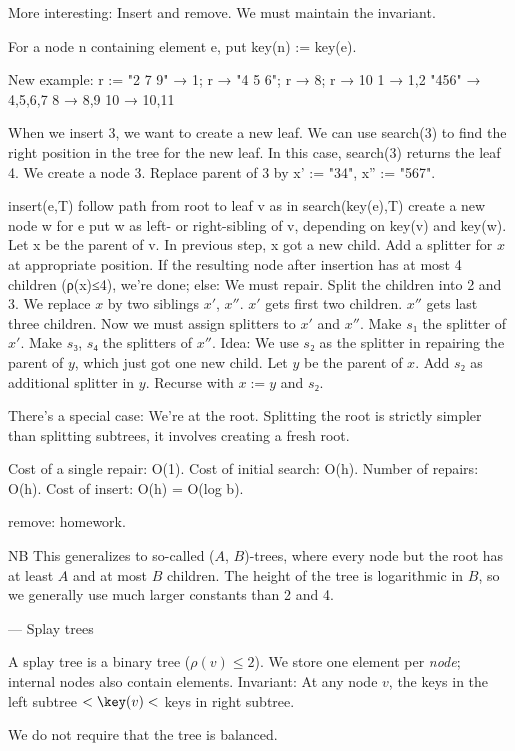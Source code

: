 More interesting: Insert and remove.
We must maintain the invariant.

For a node n containing element e, put key(n) := key(e).

New example:
	r := "2 7 9" → 1; r → "4 5 6"; r → 8; r → 10
	1 → 1,2
	"456" → 4,5,6,7
	8 → 8,9
	10 → 10,11

When we insert 3, we want to create a new leaf.
We can use search(3) to find the right position in the tree for the new leaf.
In this case, search(3) returns the leaf 4.
We create a node 3.
Replace parent of 3 by
	x' := "34", x'' := "567".
	
insert(e,T)
	follow path from root to leaf v as in search(key(e),T)
	create a new node w for e
	put w as left- or right-sibling of v, depending on key(v) and key(w).
	Let x be the parent of v.
	In previous step, x got a new child.
	Add a splitter for $x$ at appropriate position.
		If the resulting node after insertion has at most 4 children (ρ(x)≤4), we're done; else:
		We must repair.
		Split the children into 2 and 3.
		We replace $x$ by two siblings $x'$, $x''$.
		$x'$ gets first two children.
		$x''$ gets last three children.
		Now we must assign splitters to $x'$ and $x''$.
		Make $s₁$ the splitter of $x'$.
		Make $s₃$, $s₄$ the splitters of $x''$.
		Idea: We use $s₂$ as the splitter in repairing the parent of $y$, which just got one new child.
		Let $y$ be the parent of $x$.
		Add $s₂$ as additional splitter in $y$.
		Recurse with $x := y$ and $s₂$.

There's a special case: We're at the root.
Splitting the root is strictly simpler than splitting subtrees, it involves creating a fresh root.

Cost of a single repair: O(1).
Cost of initial search: O(h).
Number of repairs: O(h).
Cost of insert: O(h) = O(log b).

remove: homework.

NB This generalizes to so-called ($A$, $B$)-trees, where every node but the root has at least $A$ and at most $B$ children.
The height of the tree is logarithmic in $B$, so we generally use much larger constants than 2 and 4.

— Splay trees

A splay tree is a binary tree (\ie $ρ(v) ≤ 2$).
We store one element per \emph{node}; \ie internal nodes also contain elements.
Invariant: At any node $v$, the keys in the left subtree $< \key(v) <$ keys in right subtree.

We do not require that the tree is balanced.

